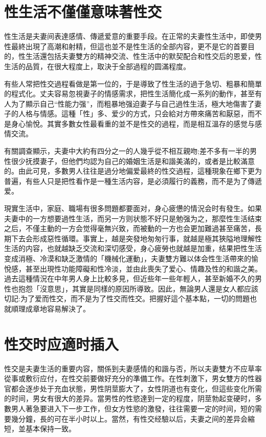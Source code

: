 \documentclass[12pt,UTF8]{ctexbook}
\begin{document}
\section{性生活不僅僅意味著性交}

性生活是夫妻间表達感情、傳遞爱意的重要手段。在正常的夫妻性生活中，即使男性最終出現了高潮和射精，但這也並不是性生活的全部内容，更不是它的首要目的，性生活還包括夫妻雙方的精神交流、性生活中的默契配合和性交后的恩爱，性生活的品質，在很大程度上，取決于全部過程的圆滿程度。

有些人常把性交過程看做是第一位的，于是導致了性生活的過于急切、粗暴和簡單的程式化。丈夫容易忽視妻子的情感需求，把性生活簡化成一系列的動作，甚至有人为了顯示自己“性能力强”，而粗暴地强迫妻子与自己過性生活，極大地傷害了妻子的人格与情感。這種「性」多、爱少的方式，只会給对方帶來痛苦和厭惡，而不是身心愉悅。其實多數女性最看重的並不是性交的過程，而是相互溫存的感觉与感情交流。

有關調查顯示，夫妻中大約有四分之一的人幾乎從不相互親吻;差不多有一半的男性很少抚摸妻子，但他們均認为自己的婚姻生活是和諧美滿的，或者是比較滿意的。由此可見，多數男人往往是過分地偏爱最終的性交過程，這種現象在鄉下更为普遍，有些人只是把性看作是一種生活内容，是必須履行的義務，而不是为了傳遞爱。

現實生活中，家庭、職場有很多問題都要面对，身心疲憊的情況会时有發生。如果夫妻中的一方想要過性生活，而另一方则状態不好只是勉强为之，那麼性生活结束之后，不僅主動的一方会觉得毫無兴致，而被動的一方也会更加難過甚至痛苦，長期下去会形成惡性循環。事實上，越是突發地匆匆行事，就越是極其狹隘地理解性生活的内容，也就越缺乏交流和深切感受，身心疲勞也就越是加重，结果把性生活变成消極、冷漠和缺乏激情的「機械化運動」，夫妻雙方難以体会性生活帶來的愉悅感，甚至出現性功能障礙和性冷淡，並由此喪失了爱心、情趣及性的和諧之美。過去這種情況在中年男人身上比較多見，但近些年一些年輕人，甚至新婚不久的男性也抱怨「沒意思」，其實是同樣的原因所導致。因此，無論男人還是女人都应該切記:为了爱而性交，而不是为了性交而性交。把握好這个基本點，一切的問題也就順理成章地容易解決了。

\section{性交时应適时插入}

性交是夫妻生活的重要内容，關係到夫妻感情的和諧与否，所以夫妻雙方不应草率從事或敷衍应付，在性交前要做好充分的準備工作。在性刺激下，男女雙方的性器官都会逐步处于充血状態，男性阴莖膨大了，女性阴道也有变化，但這些变化所需的时间，男女有很大的差异。當男性的性慾達到一定的程度，阴莖勃起变硬时，多數男人著急要进入下一步工作，但女方性慾的激發，往往需要一定的时间，短的需要幾分鐘，長的可在半小时以上。當然，有性交经驗以后，夫妻之间的差异会縮短，並基本保持一致。
\end{document}
